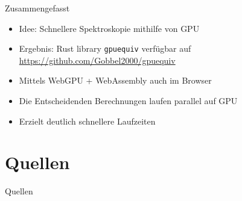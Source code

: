 \documentclass{beamer}
\begin{document}
\begin{frame}{Zusammengefasst}
    \begin{itemize}
        \item Idee: Schnellere Spektroskopie mithilfe von GPU
        \item Ergebnis: Rust library \texttt{gpuequiv} verfügbar auf
            \url{https://github.com/Gobbel2000/gpuequiv}
        \item Mittels WebGPU + WebAssembly auch im Browser
        \item Die Entscheidenden Berechnungen laufen parallel auf GPU
        \item Erzielt deutlich schnellere Laufzeiten
    \end{itemize}
\end{frame}

\section*{Quellen}

\begin{frame}{Quellen}
    \printbibliography
\end{frame}
\end{document}
